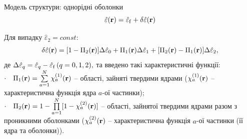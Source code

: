 \documentclass[10pt]{beamer}
\begin{document}
\begin{frame}{Модель структури: однорідні оболонки}
$$
    \hat{\varepsilon} ({\bf r}) = \hat{\varepsilon}_{\rm f} + \delta\hat{\varepsilon} ({\bf r})
$$

Для випадку $\hat{\varepsilon}_2 = const$:
\begin{equation*}
\begin{split}
    \delta\hat{\varepsilon}({\bf r}) = [1 - \Pi_2({\bf r})]\Delta\hat{\varepsilon}_0 + \Pi_1({\bf r}) \Delta\hat{\varepsilon}_1 
    + [\Pi_2({\bf r}) - \Pi_1({\bf r})]\Delta\hat{\varepsilon}_2,
\end{split}
\end{equation*}
де $\Delta\hat{\varepsilon}_q = \hat{\varepsilon}_{q} - \hat{\varepsilon}_{\rm f}\, (q=0,1,2),$ та введено такі характеристичні функції: \\
$\cdot\quad \Pi_1 ({\bf r}) = \sum\limits_{a=1}^N \chi_a^{(1)} ({\bf r})$ -- області, зайняті твердими ядрами ($\chi_a^{(1)}({\bf r})$ -- характеристична функція ядра $a$-ої частинки);\\
$\cdot\quad \Pi_2 ({\bf r}) = 1 - \prod\limits_{a=1}^N [1 - \chi_a^{(2)} ({\bf r})]$ -- області, зайнятої твердими ядрами разом з проникними оболонками ($\chi_a^{(2)}({\bf r})$ -- характеристична функція $a$-ої частинки (її ядра та оболонки)).


\end{frame}
\end{document}
